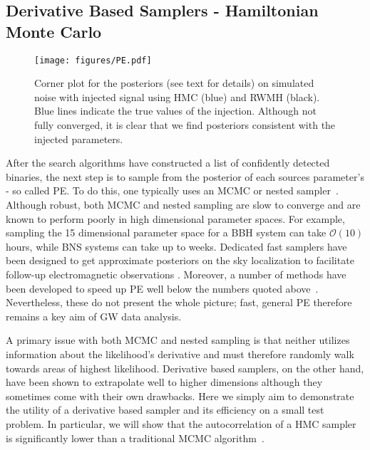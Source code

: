 \documentclass[twocolumn]{aastex631}
\begin{document}
\subsection{Derivative Based Samplers - Hamiltonian Monte Carlo}
\label{subsec:hmc}

\begin{figure*}[t]
    \centering
    \texttt{[image: figures/PE.pdf]}
    \caption{
        Corner plot for the posteriors (see text for details) on simulated noise with injected signal using HMC (blue) and RWMH (black). 
        Blue lines indicate the true values of the injection. 
        Although not fully converged, it is clear that we find posteriors consistent with the injected parameters. 
    }
    \label{fig:corner}
\end{figure*}

After the search algorithms have constructed a list of confidently detected binaries, the next step is to sample from the posterior of each sources parameter's - so called PE.
To do this, one typically uses an MCMC or nested sampler~\citep{Skilling2004, multinest, dynesty}.
Although robust, both MCMC and nested sampling are slow to converge and are known to perform poorly in high dimensional parameter spaces.
For example, sampling the 15 dimensional parameter space for a BBH system can take $\mathcal{O}(10)$ hours, while BNS systems can take up to weeks.
Dedicated fast samplers have been designed to get approximate posteriors on the sky localization to facilitate follow-up electromagnetic observations \citep[e.g.~\texttt{BAYESTAR}][]{Singer:2015ema}. 
Moreover, a number of methods have been developed to speed up PE well below the numbers quoted above~\citep{Dax:2021tsq, Islam:2022afg,Roulet:2022kot, Zackay:2018qdy, Cornish:2021lje, Canizares:2013ywa, Leslie:2021ssu}.
Nevertheless, these do not present the whole picture; fast, general PE therefore remains a key aim of GW data analysis.

A primary issue with both MCMC and nested sampling is that neither utilizes information about the likelihood's derivative and must therefore randomly walk towards areas of highest likelihood.
Derivative based samplers, on the other hand, have been shown to extrapolate well to higher dimensions although they sometimes come with their own drawbacks.
Here we simply aim to demonstrate the utility of a derivative based sampler and its efficiency on a small test problem.
In particular, we will show that the autocorrelation of a HMC sampler is significantly lower than a traditional MCMC algorithm~\citep{Bouffanais:2018hoz, 2014CQGra..31n5004P}.
\end{document}
